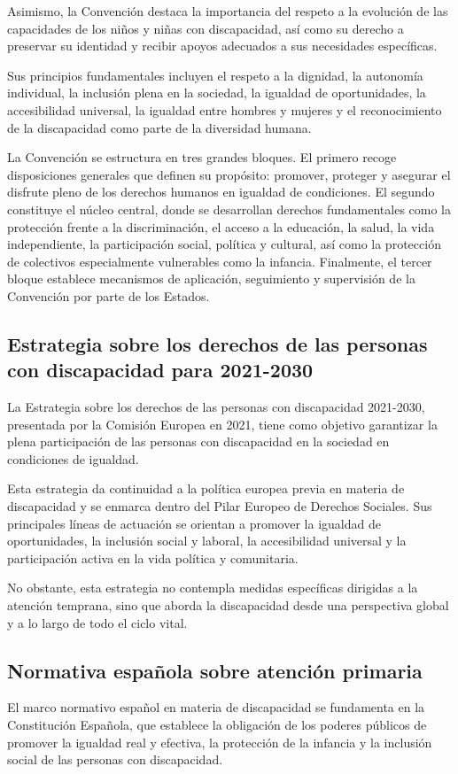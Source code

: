 \documentclass{article}
\begin{document}
Asimismo, la Convención destaca la importancia del respeto a la evolución de las capacidades de los niños y niñas con discapacidad, así como su derecho a preservar su identidad y recibir apoyos adecuados a sus necesidades específicas.

Sus principios fundamentales incluyen el respeto a la dignidad, la autonomía individual, la inclusión plena en la sociedad, la igualdad de oportunidades, la accesibilidad universal, la igualdad entre hombres y mujeres y el reconocimiento de la discapacidad como parte de la diversidad humana.

La Convención se estructura en tres grandes bloques. El primero recoge disposiciones generales que definen su propósito: promover, proteger y asegurar el disfrute pleno de los derechos humanos en igualdad de condiciones. El segundo constituye el núcleo central, donde se desarrollan derechos fundamentales como la protección frente a la discriminación, el acceso a la educación, la salud, la vida independiente, la participación social, política y cultural, así como la protección de colectivos especialmente vulnerables como la infancia. Finalmente, el tercer bloque establece mecanismos de aplicación, seguimiento y supervisión de la Convención por parte de los Estados.

\subsection{\textbf{Estrategia sobre los derechos de las personas con discapacidad para 2021-2030}}
La Estrategia sobre los derechos de las personas con discapacidad 2021-2030, presentada por la Comisión Europea en 2021, tiene como objetivo garantizar la plena participación de las personas con discapacidad en la sociedad en condiciones de igualdad.

Esta estrategia da continuidad a la política europea previa en materia de discapacidad y se enmarca dentro del Pilar Europeo de Derechos Sociales. Sus principales líneas de actuación se orientan a promover la igualdad de oportunidades, la inclusión social y laboral, la accesibilidad universal y la participación activa en la vida política y comunitaria.

No obstante, esta estrategia no contempla medidas específicas dirigidas a la atención temprana, sino que aborda la discapacidad desde una perspectiva global y a lo largo de todo el ciclo vital.

\subsection{\textbf{Normativa española sobre atención primaria}}
El marco normativo español en materia de discapacidad se fundamenta en la Constitución Española, que establece la obligación de los poderes públicos de promover la igualdad real y efectiva, la protección de la infancia y la inclusión social de las personas con discapacidad.
\end{document}
